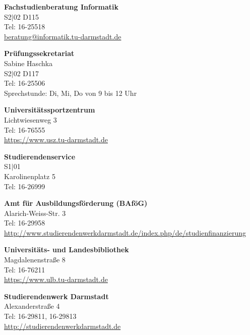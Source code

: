 \begin{multicols}{2}
    \vspace{3mm}
    \textbf{Fachstudienberatung Informatik}\\
    S2$|$02 D115\\
    Tel: 16-25518 \\
    \href{mailto:beratung@informatik.tu-darmstadt.de}{beratung@informatik.tu-darmstadt.de}

    \vspace{3mm}
    \textbf{Prüfungssekretariat}\\
    Sabine Haschka\\
    S2$|$02 D117\\
    Tel: 16-25506\\
    Sprechstunde: Di, Mi, Do von 9 bis 12 Uhr

    \vspace{3mm}
    \textbf{Universitätssportzentrum}\\
    Lichtwiesenweg 3\\
    Tel: 16-76555\\
    \url{https://www.usz.tu-darmstadt.de}

    \vspace{3mm}
    \textbf{Studierendenservice}\\
    S1$|$01\\
    Karolinenplatz 5\\
    Tel: 16-26999

    \vspace{3mm}
    \textbf{Amt für Ausbildungsförderung (BAföG)}\\
    Alarich-Weiss-Str. 3 \\
    Tel: 16-29958\\
    \url{http://www.studierendenwerkdarmstadt.de/index.php/de/studienfinanzierung}

    \vspace{3mm}
    \textbf{Universitäts- und Landesbibliothek}\\
    Magdalenenstraße 8\\
    Tel: 16-76211\\
    \url{https://www.ulb.tu-darmstadt.de}

    \vspace{3mm}
    \textbf{Studierendenwerk Darmstadt}\\
    Alexanderstraße 4 \\
    Tel: 16-29811, 16-29813\\
    \url{http://studierendenwerkdarmstadt.de}


\end{multicols}

\newpage
